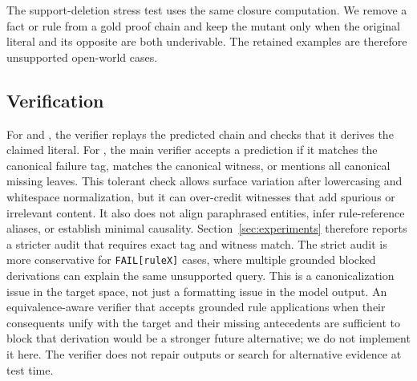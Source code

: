 The support-deletion stress test uses the same closure computation. We remove a
fact or rule from a gold proof chain and keep the mutant only when the original
literal and its opposite are both underivable. The retained examples are
therefore unsupported open-world cases.

\subsection{Verification}

For \prove{} and , the verifier replays the predicted chain and checks
that it derives the claimed literal. For \abstain{}, the main verifier accepts a
prediction if it matches the canonical failure tag, matches the canonical
witness, or mentions all canonical missing leaves. This tolerant check allows
surface variation after lowercasing and whitespace normalization, but it can
over-credit witnesses that add spurious or irrelevant content. It also does not
align paraphrased entities, infer rule-reference aliases, or establish minimal
causality. Section~\ref{sec:experiments} therefore reports a stricter audit
that requires exact tag and witness match. The strict audit is more conservative
for \texttt{FAIL[ruleX]} cases, where multiple grounded blocked derivations can
explain the same unsupported query. This is a canonicalization issue in the
target space, not just a formatting issue in the model output. An
equivalence-aware verifier that accepts grounded rule applications when their
consequents unify with the target and their missing antecedents are sufficient
to block that derivation would be a stronger future alternative; we do not
implement it here. The verifier does not repair outputs or search for
alternative evidence at test time.
